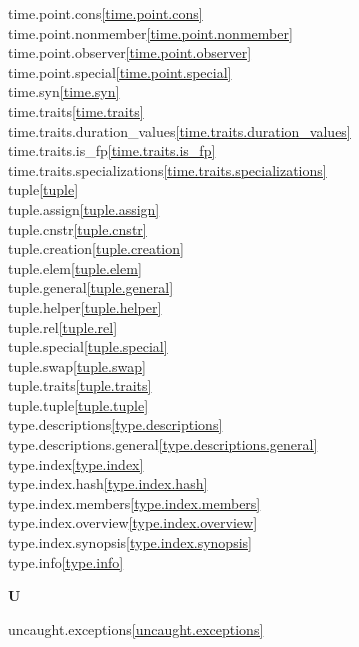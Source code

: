\begin{multicols}{2}
time.point.cons\quad\ref{time.point.cons}\\
time.point.nonmember\quad\ref{time.point.nonmember}\\
time.point.observer\quad\ref{time.point.observer}\\
time.point.special\quad\ref{time.point.special}\\
time.syn\quad\ref{time.syn}\\
time.traits\quad\ref{time.traits}\\
time.traits.duration_values\quad\ref{time.traits.duration_values}\\
time.traits.is_fp\quad\ref{time.traits.is_fp}\\
time.traits.specializations\quad\ref{time.traits.specializations}\\
tuple\quad\ref{tuple}\\
tuple.assign\quad\ref{tuple.assign}\\
tuple.cnstr\quad\ref{tuple.cnstr}\\
tuple.creation\quad\ref{tuple.creation}\\
tuple.elem\quad\ref{tuple.elem}\\
tuple.general\quad\ref{tuple.general}\\
tuple.helper\quad\ref{tuple.helper}\\
tuple.rel\quad\ref{tuple.rel}\\
tuple.special\quad\ref{tuple.special}\\
tuple.swap\quad\ref{tuple.swap}\\
tuple.traits\quad\ref{tuple.traits}\\
tuple.tuple\quad\ref{tuple.tuple}\\
type.descriptions\quad\ref{type.descriptions}\\
type.descriptions.general\quad\ref{type.descriptions.general}\\
type.index\quad\ref{type.index}\\
type.index.hash\quad\ref{type.index.hash}\\
type.index.members\quad\ref{type.index.members}\\
type.index.overview\quad\ref{type.index.overview}\\
type.index.synopsis\quad\ref{type.index.synopsis}\\
type.info\quad\ref{type.info}\\
\par \textbf{U}\par
uncaught.exceptions\quad\ref{uncaught.exceptions}\\

\end{multicols}
